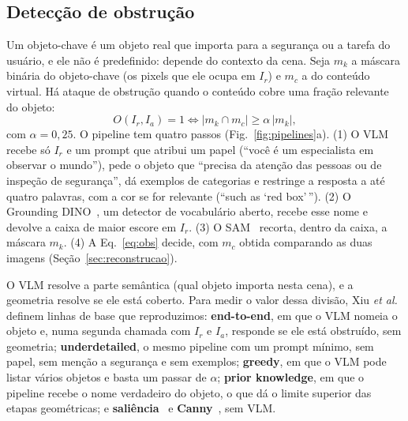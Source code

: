\documentclass[conference]{IEEEtran}
\newcommand{\Ir}{I_r}
\newcommand{\Ia}{I_a}
\begin{document}
\subsection{Detecção de obstrução}
\label{sec:viddar-obs}
Um objeto-chave é um objeto real que importa para a segurança ou a tarefa do usuário, e ele não é
predefinido: depende do contexto da cena. Seja $m_k$ a máscara binária do objeto-chave (os pixels que
ele ocupa em $\Ir$) e $m_c$ a do conteúdo virtual. Há ataque de obstrução quando o conteúdo cobre uma
fração relevante do objeto:
\begin{equation}
O(\Ir,\Ia)=1 \iff |m_k \cap m_c| \geq \alpha\,|m_k|,
\label{eq:obs}
\end{equation}
com $\alpha=0{,}25$. O pipeline tem quatro passos (Fig.~\ref{fig:pipelines}a). (1) O VLM recebe só
$\Ir$ e um prompt que atribui um papel (``você é um especialista em observar o mundo''), pede o objeto
que ``precisa da atenção das pessoas ou de inspeção de segurança'', dá exemplos de categorias e
restringe a resposta a até quatro palavras, com a cor se for relevante (``such as `red box'\,''). (2) O
Grounding DINO~\cite{groundingdino}, um detector de vocabulário aberto, recebe esse nome e devolve a
caixa de maior escore em $\Ir$. (3) O SAM~\cite{sam} recorta, dentro da caixa, a máscara $m_k$. (4) A
Eq.~\eqref{eq:obs} decide, com $m_c$ obtida comparando as duas imagens (Seção~\ref{sec:reconstrucao}).

O VLM resolve a parte semântica (qual objeto importa nesta cena), e a geometria resolve se ele está
coberto. Para medir o valor dessa divisão, Xiu \emph{et al.} definem linhas de base que reproduzimos:
\textbf{end-to-end}, em que o VLM nomeia o objeto e, numa segunda chamada com $\Ir$ e $\Ia$, responde se
ele está obstruído, sem geometria; \textbf{underdetailed}, o mesmo pipeline com um prompt mínimo, sem
papel, sem menção a segurança e sem exemplos; \textbf{greedy}, em que o VLM pode listar vários objetos e
basta um passar de $\alpha$; \textbf{prior knowledge}, em que o pipeline recebe o nome verdadeiro do
objeto, o que dá o limite superior das etapas geométricas; e \textbf{saliência}~\cite{hou2007} e
\textbf{Canny}~\cite{canny}, sem VLM.
\end{document}

